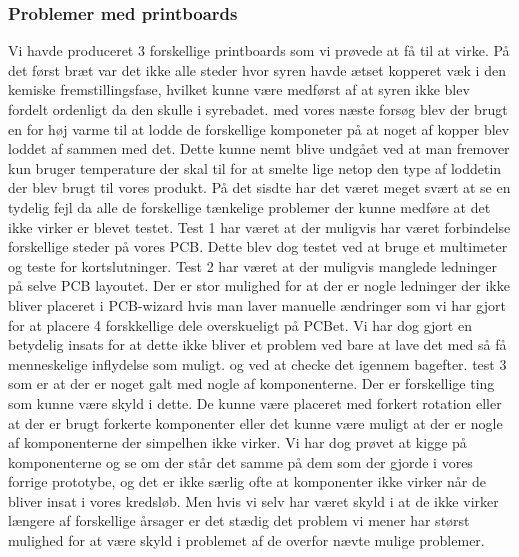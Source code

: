 \subsubsection{Problemer med printboards}
Vi havde produceret 3 forskellige printboards som vi prøvede at få til at virke.
På det først bræt var det ikke alle steder hvor syren havde ætset kopperet væk i den kemiske fremstillingsfase, hvilket kunne være medførst af at syren ikke blev fordelt ordenligt da den skulle i syrebadet.
med vores næste forsøg blev der brugt en for høj varme til at lodde de forskellige komponeter på at noget af kopper blev loddet af sammen med det. Dette kunne nemt blive undgået ved at man fremover kun bruger temperature der skal til for at smelte lige netop den type af loddetin der blev brugt til vores produkt.
På det sisdte har det været meget svært at se en tydelig fejl da alle de forskellige tænkelige problemer der kunne medføre at det ikke virker er blevet testet. 
Test 1 har været at der muligvis har været forbindelse forskellige steder på vores PCB. Dette blev dog testet ved at bruge et multimeter og teste for kortslutninger.
Test 2 har været at der muligvis manglede ledninger på selve PCB layoutet. Der er stor mulighed for at der er nogle ledninger der ikke bliver placeret i PCB-wizard hvis man laver manuelle ændringer som vi har gjort for at placere 4 forskkellige dele overskueligt på PCBet. Vi har dog gjort en betydelig insats for at dette ikke bliver et problem ved bare at lave det med så få menneskelige inflydelse som muligt. og ved at checke det igennem bagefter.
test 3 som er at der er noget galt med nogle af komponenterne. Der er forskellige ting som kunne være skyld i dette. De kunne være placeret med forkert rotation eller at der er brugt forkerte komponenter eller det kunne være muligt at der er nogle af komponenterne der simpelhen ikke virker. Vi har dog prøvet at kigge på komponenterne og se om der står det samme på dem som der gjorde i vores forrige prototybe, og det er ikke særlig ofte at komponenter ikke virker når de bliver insat i vores kredsløb. Men hvis vi selv har været skyld i at de ikke virker længere af forskellige årsager er det stædig det problem vi mener har størst mulighed for at være skyld i problemet af de overfor nævte mulige problemer.


